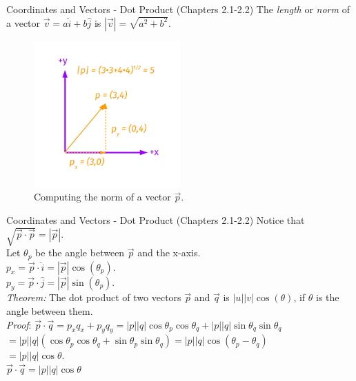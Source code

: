 \documentclass{beamer}
\begin{document}
\begin{frame}{Coordinates and Vectors - Dot Product (Chapters 2.1-2.2)}
The \textit{length} or \textit{norm} of a vector $\vec{v} = a\hat{i}+b\hat{j}$ is $|\vec{v}| = \sqrt{a^2+b^2}$.\\
\begin{figure}
\centering
\includegraphics[width=0.5\textwidth,trim=1cm 1cm 1cm 1cm,clip=true]{figures/Vectors7.pdf}
\caption{\label{fig:twovectors6} Computing the norm of a vector $\vec{p}$.}
\end{figure}
\end{frame}

\begin{frame}{Coordinates and Vectors - Dot Product (Chapters 2.1-2.2)}
Notice that $\sqrt{\vec{p}\cdot\vec{p}} = |\vec{p}|$.\\
Let $\theta_p$ be the angle between $\vec{p}$ and the x-axis.  \\
$p_{x} = \vec{p} \cdot \hat{i} = |\vec{p}| \cos(\theta_{p})$. \\
$p_{y} = \vec{p} \cdot \hat{j} = |\vec{p}| \sin(\theta_{p})$.\\
\vspace{0.5cm}
\textit{Theorem:} The dot product of two vectors $\vec{p}$ and $\vec{q}$ is $|u||v|\cos(\theta)$, if $\theta$ is the angle between them.\\
\vspace{0.5cm}
\textit{Proof}: $\vec{p}\cdot\vec{q} = p_{x}q_{x} + p_{y}q_{y} = |p||q|\cos\theta_p\cos\theta_q+|p||q|\sin\theta_q\sin\theta_q$ \\
$=|p||q|(\cos\theta_p\cos\theta_q+\sin\theta_p\sin\theta_q) = |p||q|\cos(\theta_p-\theta_q)$ \\
$=|p||q|\cos\theta$. \\
\vspace{0.1cm}
$\boxed{\vec{p}\cdot\vec{q}=|p||q|\cos\theta}$
\end{frame}
\end{document}
